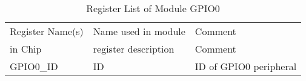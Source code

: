 \begin{table}[H]
\caption{Register List of Module GPIO0}
\label{tab:asGpioPer03}
\centering
\begin{tabularx}{\textwidth}{|l |l |X|}
  \hline
  Register Name(s) & Name used in module & Comment \\
  in Chip & register description & Comment \\
  \hline
  \hline
  GPIO0\_ID & ID & ID of GPIO0 peripheral \\
  \hline
\end{tabularx}
\end{table}
